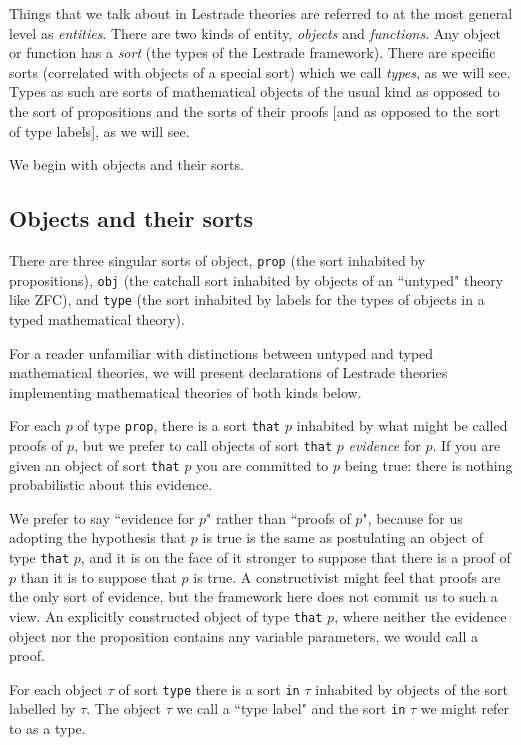 \documentclass[12pt]{article}
\begin{document}
Things that we talk about in Lestrade theories are referred to at the most general level as {\em entities\/}.  There are two kinds of entity, {\em objects\/} and {\em functions\/}.  Any object or function has a {\em sort\/} (the types of the Lestrade framework).  There are specific sorts (correlated with objects of a special sort) which we call {\em types\/}, as we will see.
Types as such are sorts of mathematical objects of the usual kind as opposed to the sort of propositions and the sorts of their proofs [and as opposed to the sort of type labels], as we will see.

We begin with objects and their sorts.

\newpage

\subsection{Objects and their sorts}

There are three singular sorts of object, {\tt prop} (the sort inhabited by propositions), {\tt obj} (the catchall sort inhabited by objects of an ``untyped" theory like ZFC), and {\tt type} (the sort inhabited by labels for the types of objects in a typed mathematical theory).

For a reader unfamiliar with distinctions between untyped and typed mathematical theories, we will present declarations of Lestrade theories implementing mathematical theories of both kinds below.

For each $p$ of type {\tt prop}, there is a sort {\tt that} $p$ inhabited by what might be called proofs of $p$, but we prefer to call objects of sort {\tt that} $p$ {\em evidence\/} for $p$.  If you are given an object of sort {\tt that} $p$ you are committed to $p$ being true:  there is nothing probabilistic about this evidence.

We prefer to say ``evidence for $p$" rather than ``proofs of $p$", because for us adopting the hypothesis that $p$ is
true is the same as postulating an object of type {\tt that} $p$, and it is on the face of it stronger to suppose that there is a proof of $p$ than it is to suppose that $p$ is true.  A constructivist might feel that proofs are the only sort of evidence, but the framework here does not commit us to such a view.  An explicitly constructed object of type {\tt that} $p$, where neither the evidence object nor the proposition contains any variable parameters, we would call a proof.

For each object $\tau$ of sort {\tt type} there is a sort {\tt in} $\tau$ inhabited by objects of the sort labelled by $\tau$.
The object $\tau$ we call a ``type label" and the sort {\tt in} $\tau$ we might refer to as a type.
\end{document}
